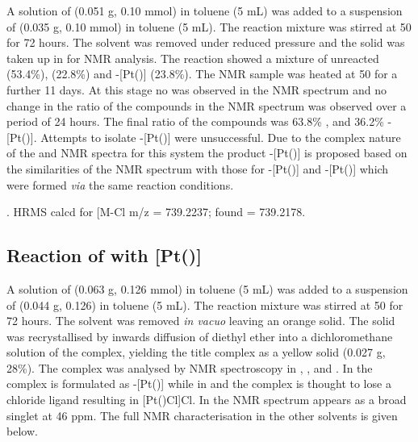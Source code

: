 A solution of \tBusixantphos{} (0.051 g, 0.10 mmol) in toluene (5 mL) was added to a suspension of \ce{[Pt(C6H10)Cl2]} (0.035 g, 0.10 mmol) in toluene (5 mL).  The reaction mixture was stirred at 50 \degC{} for 72 hours.  The solvent was removed under reduced pressure and the solid was taken up in  for NMR analysis.  The reaction showed a mixture of unreacted \tBusixantphos{} (53.4\%), \tBusixantphos {} (22.8\%) and \trans-[Pt(\tBusixantphos)] (23.8\%).  The NMR sample was heated at 50 \degC{} for a further 11 days.  At this stage no \ce{[Pt(C6H10)Cl2]} was observed in the \proton{} NMR spectrum and no change in the ratio of the compounds in the \phosphorus{} NMR spectrum was observed over a period of 24 hours.  The final ratio of the compounds was 63.8\% \tBusixantphos {}, and 36.2\% \trans-[Pt(\tBusixantphos)].  Attempts to isolate \trans-[Pt(\tBusixantphos)] were unsuccessful.  Due to the complex nature of the \proton{} and \carbon{} NMR spectra for this system the product \trans-[Pt(\tBusixantphos)] is proposed based on the similarities of the \phosphorus{} NMR spectrum with those for \trans-[Pt(\tButhixantphos)] and \trans-[Pt(\tBuxantphos)] which were formed \emph{via} the same reaction conditions. 

\begin{sloppypar}
.
HRMS calcd for  [M-Cl\ce{]+} m/z = 739.2237; found = 739.2178.
\end{sloppypar}

\subsection*{Reaction of \tBuxantphos{} with [Pt()]}


A solution of \tBuxantphos{} (0.063 g, 0.126 mmol) in toluene (5 mL) was added to a suspension of \ce{[Pt(C6H10)Cl2]} (0.044 g, 0.126) in toluene (5 mL).  The reaction mixture was stirred at 50 \degC{} for 72 hours.  The solvent was removed \emph{in vacuo} leaving an orange solid.  The solid was recrystallised by inwards diffusion of diethyl ether into a dichloromethane solution of the complex, yielding the title complex as a yellow solid (0.027 g, 28\%).  The complex was analysed by NMR spectroscopy in , ,  and .  In  the complex is formulated as \trans-[Pt(\tBuxantphos)] while in  and  the complex is thought to lose a chloride ligand resulting in [Pt(\tBuxantphosk)Cl]Cl.  In  the \phosphorus{} NMR spectrum appears as a broad singlet at 46 ppm.  The full NMR characterisation in the other solvents is given below.  


